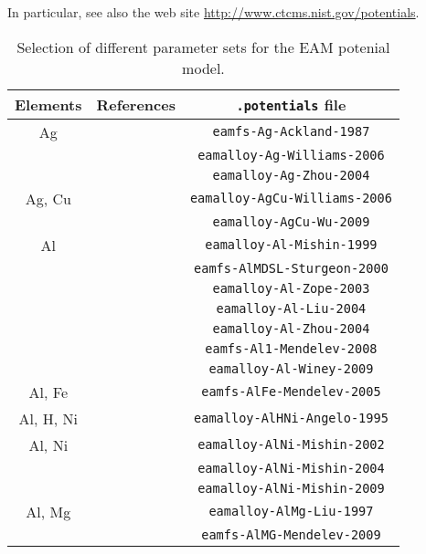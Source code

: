 In particular, see also the web site \url{http://www.ctcms.nist.gov/potentials}.

\begin{table}
  \caption{Selection of different parameter sets for the EAM potenial model.}
  \label{tab:EAM-A}
  {\footnotesize
    \begin{center}
      \begin{tabular}{ccc}
        Elements & References & \texttt{.potentials} file\\\hline
        Ag & \cite{ackland1987simple} & \verb+eamfs-Ag-Ackland-1987+\\
        &\cite{williams2006embedded} & \verb+eamalloy-Ag-Williams-2006+\\
        & \cite{zhou2004misfit} & \verb+eamalloy-Ag-Zhou-2004+\\\hline
        Ag, Cu &\cite{williams2006embedded} & \verb+eamalloy-AgCu-Williams-2006+\\
        & \cite{wu2009cu} & \verb+eamalloy-AgCu-Wu-2009+\\\hline
        Al & \cite{mishin1999interatomic} & \verb+eamalloy-Al-Mishin-1999+\\
        & \cite{sturgeon2000adjusting} & \verb+eamfs-AlMDSL-Sturgeon-2000+\\
        & \cite{zope2003interatomic} & \verb+eamalloy-Al-Zope-2003+\\
        & \cite{liu2004aluminium} & \verb+eamalloy-Al-Liu-2004+\\
        & \cite{zhou2004misfit} & \verb+eamalloy-Al-Zhou-2004+\\
        & \cite{mendelev2008analysis} & \verb+eamfs-Al1-Mendelev-2008+\\
        & \cite{winey2009thermodynamic} & \verb+eamalloy-Al-Winey-2009+\\\hline
        Al, Fe & \cite{Mendelev2005} & \verb+eamfs-AlFe-Mendelev-2005+ \\\hline
        Al, H, Ni& \cite{angelo1995trapping} & \verb+eamalloy-AlHNi-Angelo-1995+\\\hline
        Al, Ni & \cite{mishin2002embedded} & \verb+eamalloy-AlNi-Mishin-2002+\\
        & \cite{mishin2004atomistic} & \verb+eamalloy-AlNi-Mishin-2004+\\
        & \cite{purja2009development} & \verb+eamalloy-AlNi-Mishin-2009+\\\hline
        Al, Mg & \cite{liu1997anisotropic} & \verb+eamalloy-AlMg-Liu-1997+\\
        & \cite{mendelev2009development} & \verb+eamfs-AlMG-Mendelev-2009+\\\hline

\end{tabular}
\end{center}}
\end{table}
